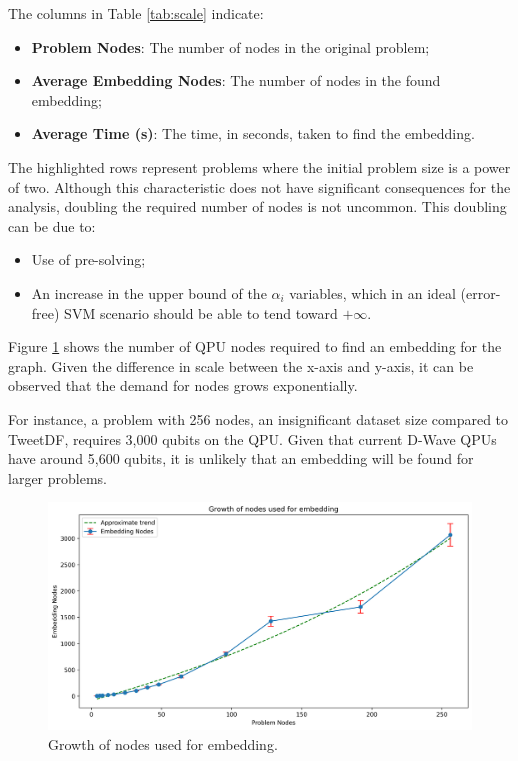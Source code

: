 The columns in Table \ref{tab:scale} indicate: 
\begin{itemize} 
	\item \textbf{Problem Nodes}: The number of nodes in the original problem; 
	\item \textbf{Average Embedding Nodes}: The number of nodes in the found embedding; 
	\item \textbf{Average Time (s)}: The time, in seconds, taken to find the embedding. 
\end{itemize}

The highlighted rows represent problems where the initial problem size is a power of two. 
Although this characteristic does not have significant consequences for the analysis, doubling the required number of nodes is not uncommon. This doubling can be due to:
\begin{itemize} 
	\item Use of pre-solving; 
	\item An increase in the upper bound of the $\alpha_i$ variables, which in an ideal (error-free) SVM scenario should be able to tend toward $+\infty$. 
\end{itemize}

Figure \ref{fig:scale_nodes} shows the number of QPU nodes required to find an embedding for the graph. 
Given the difference in scale between the x-axis and y-axis, it can be observed that the demand for nodes grows exponentially.

For instance, a problem with 256 nodes, an insignificant dataset size compared to TweetDF, requires 3,000 qubits on the QPU. 
Given that current D-Wave QPUs have around 5,600 qubits, it is unlikely that an embedding will be found for larger problems.

\begin{figure}[H] 
	\centering 
	\includegraphics[width=\textwidth]{figures/scale_node.png} 
	\caption{Growth of nodes used for embedding.}
	\label{fig:scale_nodes}
\end{figure}

